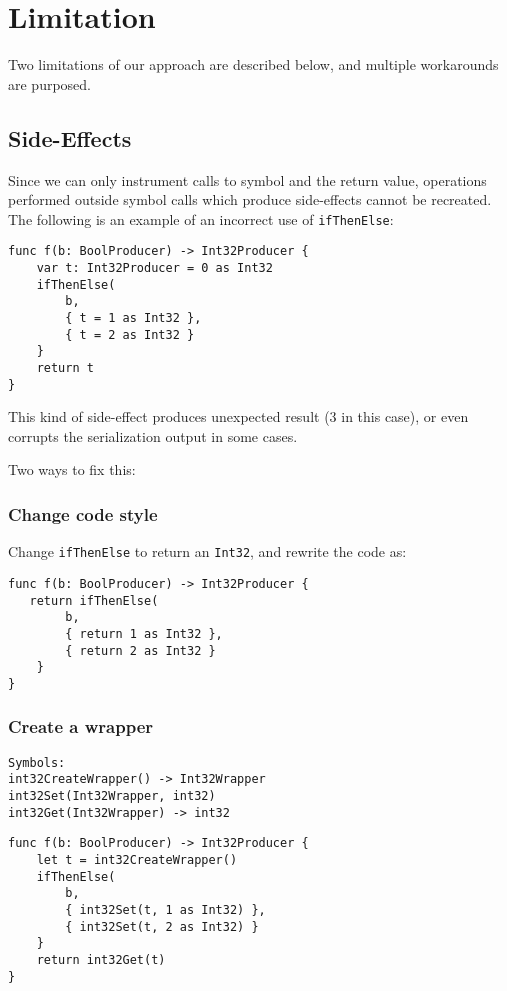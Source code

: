 \documentclass[12pt]{article}
\begin{document}
\section{Limitation}
Two limitations of our approach are described below, and multiple workarounds are purposed.

\subsection{Side-Effects}
Since we can only instrument calls to symbol and the return value, operations performed outside symbol calls which produce side-effects cannot be recreated. The following is an example of an incorrect use of \texttt{ifThenElse}:
\begin{lstlisting}
func f(b: BoolProducer) -> Int32Producer {
    var t: Int32Producer = 0 as Int32
    ifThenElse(
        b,
        { t = 1 as Int32 },
        { t = 2 as Int32 }
    }
    return t
}
\end{lstlisting}
This kind of side-effect produces unexpected result (3 in this case), or even corrupts the serialization output in some cases.

Two ways to fix this:

\subsubsection{Change code style}
Change \texttt{ifThenElse} to return an \texttt{Int32}, and rewrite the code as:
\begin{lstlisting}
func f(b: BoolProducer) -> Int32Producer {
   return ifThenElse(
        b,
        { return 1 as Int32 },
        { return 2 as Int32 }
    }
}
\end{lstlisting}

\subsubsection{Create a wrapper}
\begin{lstlisting}
Symbols:
int32CreateWrapper() -> Int32Wrapper
int32Set(Int32Wrapper, int32)
int32Get(Int32Wrapper) -> int32
\end{lstlisting}
\begin{lstlisting}
func f(b: BoolProducer) -> Int32Producer {
    let t = int32CreateWrapper()
    ifThenElse(
        b,
        { int32Set(t, 1 as Int32) },
        { int32Set(t, 2 as Int32) }
    }
    return int32Get(t)
}
\end{lstlisting}
\end{document}
